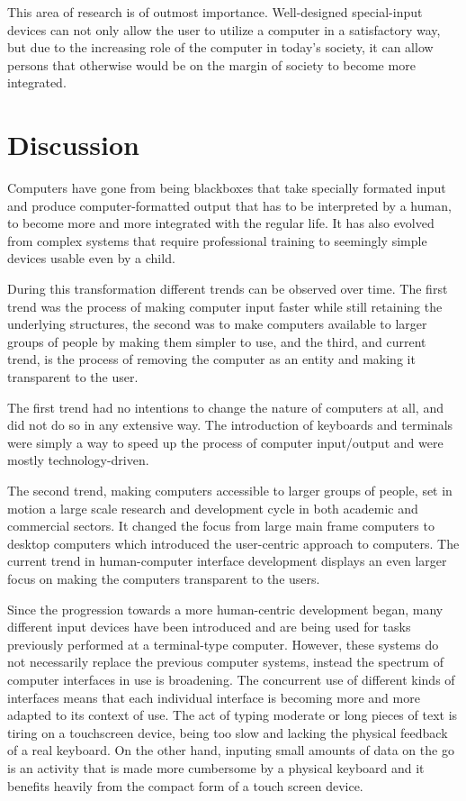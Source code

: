 This area of research is of outmost importance. Well-designed special-input devices can not only allow the user to utilize a computer in a satisfactory way, but due to the increasing role of the computer in today's society, it can allow persons that otherwise would be on the margin of society to become more integrated.

\section{Discussion}

Computers have gone from being blackboxes that take specially formated input and produce computer-formatted output that has to be interpreted by a human, to become more and more integrated with the regular life. It has also evolved from complex systems that require professional training to seemingly simple devices usable even by a child.

During this transformation different trends can be observed over time. The first trend was the process of making computer input faster while still retaining the underlying structures, the second was to make computers available to larger groups of people by making them simpler to use, and the third, and current trend, is the process of removing the computer as an entity and making it transparent to the user.

The first trend had no intentions to change the nature of computers at all, and did not do so in any extensive way. The introduction of keyboards and terminals were simply a way to speed up the process of computer input/output and were mostly technology-driven. 

The second trend, making computers accessible to larger groups of people, set in motion a large scale research and development cycle in both academic and commercial sectors. It changed the focus from large main frame computers to desktop computers which introduced the user-centric approach to computers. The current trend in human-computer interface development displays an even larger focus on making the computers transparent to the users.

Since the progression towards a more human-centric development began, many different input devices have been introduced and are being used for tasks previously performed at a terminal-type computer. However, these systems do not necessarily replace the previous computer systems, instead the spectrum of computer interfaces in use is broadening. The concurrent use of different kinds of interfaces means that each individual interface is becoming more and more adapted to its context of use. The act of typing moderate or long pieces of text is tiring on a touchscreen device, being too slow and lacking the physical feedback of a real keyboard. On the other hand, inputing small amounts of data on the go is an activity that is made more cumbersome by a physical keyboard and it benefits heavily from the compact form of a touch screen device.

